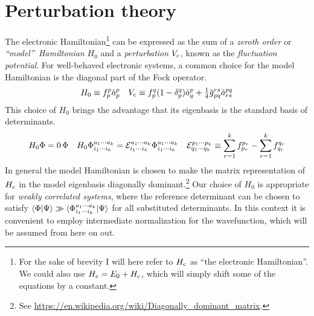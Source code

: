 \documentclass[11pt]{article}
\numberwithin{equation}{section}
\begin{document}
\setcounter{section}{5}
\section{Perturbation theory}

\begin{dfn}
The electronic Hamiltonian\footnote{For the sake of brevity I will here refer to $H_{\mathrm{c}}$ as ``the electronic Hamiltonian''.  We could also use $H_e=E_0+H_{\mathrm{c}}$, which will simply shift some of the equations by a constant.} can be expressed as the sum of a \textit{zeroth order} or \textit{``model''~Hamiltonian} $H_0$ and a \textit{perturbation} $V_{\mathrm{c}}$, known as the \textit{fluctuation potential}.
For well-behaved electronic systems, a common choice for the model Hamiltonian is the diagonal part of the Fock operator.
\begin{align}
\label{eq:diagonal-fock-model-hamiltonian}
  H_0
\equiv
  f_p^p
  \tilde{a}^p_p
&&
  V_{\mathrm{c}}
\equiv
  f_p^q
  (
    1
  -
    \delta _p^q
  )
  \tilde{a}^p_q
+
  \tfrac{1}{4}
  \overline{g}_{pq}^{rs}
  \tilde{a}^{pq}_{rs}
\end{align}
This choice of $H_0$ brings the advantage that its eigenbasis is the standard basis of determinants.
\begin{align}
\label{eq:model-problem}
  H_0
  \Phi 
=
  0\,
  \Phi 
&&
  H_0
  \Phi _{i_1\cdots i_k}^{a_1\cdots a_k}
=
  \mathcal{E}_{i_1\cdots i_k}^{a_1\cdots a_k}
  \Phi _{i_1\cdots i_k}^{a_1\cdots a_k}
&&
  \mathcal{E}_{q_1\cdots q_k}^{p_1\cdots p_k}
\equiv
  \sum_{r=1}^k
  f_{p_r}^{p_r}
-
  \sum_{r=1}^k
  f_{q_r}^{q_r}
\end{align}
In general the model Hamiltonian is chosen to make the matrix representation of $H_{\mathrm{c}}$ in the model eigenbasis diagonally dominant.\footnote{See \url{https://en.wikipedia.org/wiki/Diagonally_dominant_matrix}.}
Our choice of $H_0$ is appropriate for \textit{weakly correlated systems}, where the reference determinant can be chosen to satisfy $\langle\Phi |\Psi \rangle\gg \langle\Phi _{i_1\cdots i_k}^{a_1\cdots a_k}|\Psi \rangle$ for all substituted determinants.
In this context it is convenient to employ intermediate normalization for the wavefunction, which will be assumed from here on out.
\end{dfn}
\end{document}
